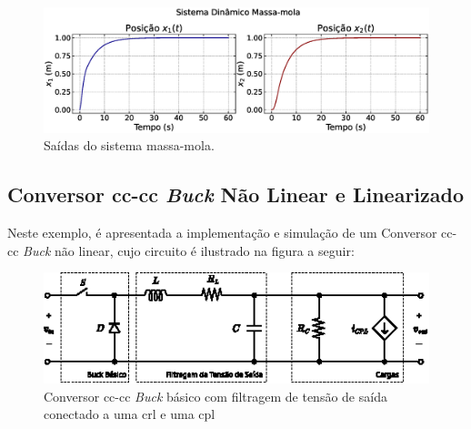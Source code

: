 \begin{figure}[H]
  \centering
  \includegraphics[width=1.\textwidth]{figuras/apendices/A/result.eps}
  \caption{Saídas do sistema massa-mola.}
  \label{fig:result_sistema_massa_mola}
\end{figure}

\subsection{Conversor \acrshort{cc}-\acrshort{cc} \textit{Buck} Não Linear e Linearizado} \label{seção_apendice_a_conversor_buck}

Neste exemplo, é apresentada a implementação e simulação de um Conversor \acrshort{cc}-\acrshort{cc} \textit{Buck} não linear, cujo circuito é ilustrado na figura a seguir:

\begin{figure}[H]
  \centering
  \includegraphics[width=1.\textwidth]{figuras/buck_converter_circuit.eps}
  \captionsetup{justification=centering}
  \caption{Conversor \acrshort{cc}-\acrshort{cc} \textit{Buck} básico com filtragem de tensão de saída conectado a uma \acrshort{crl} e uma \acrshort{cpl}}
  \label{eq:apendice_circuito_buck}
\end{figure}

